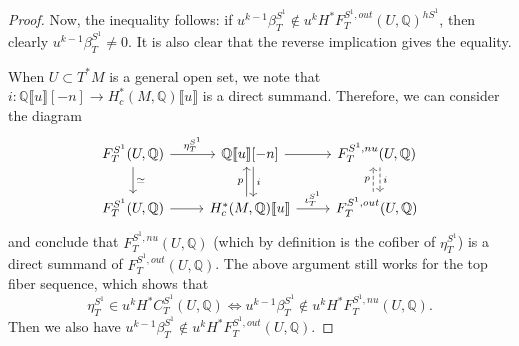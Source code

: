 \documentclass[11pt]{amsart}
\numberwithin{equation}{section}
\theoremstyle{plain}
\theoremstyle{definition}
\theoremstyle{remark}
\newcommand{\bQ} { {\mathbb{Q}}}
\newcommand{\fpw}[1]{{\llbracket #1\rrbracket}}
\begin{document}
\begin{proof}
Now, the inequality follows: if $u^{k-1}\beta_T^{S^1}\notin  u^kH^*F^{S^1,out}_{T}(U,\bQ)^{hS^1}$, then clearly $u^{k-1}\beta_T^{S^1}\neq 0$. It is also clear that the reverse implication gives the equality.

When $U \subset T^*M$ is a general open set, we note that $i: \bQ\fpw{u}[-n] \rightarrow H_c^*(M,\bQ)\fpw{u}$ is a direct summand. Therefore, we can consider the diagram
\[\begin{tikzcd}
{F_T^{S^1}(U,\bQ)}\ar[r,"{\eta_T^{S^1}}"] \ar[d,"\simeq"] & {\bQ\fpw{u}[-n]} \ar[r] \ar[d,"i", shift left=1] & F_T^{S^1,nu}(U,\bQ) \ar[d,"i", dashed, shift left=1] \\ 
{F_T^{S^1}(U,\bQ)}\ar[r] & {H_c^*(M,\bQ)\fpw{u}} \ar[r,"{\iota_T^{S^1}}"] \ar[u,"p", shift left=1] & F_T^{S^1,out}(U,\bQ) \ar[u,"p", dashed, shift left=1]
\end{tikzcd}\]
and conclude that $F_T^{S^1,nu}(U,\bQ)$ (which by definition is the cofiber of $\eta_T^{S^1}$) is a direct summand of $F_T^{S^1,out}(U,\bQ)$. The above argument still works for the top fiber sequence, which shows that
\[\eta_T^{S^1} \in u^kH^*C_T^{S^1}(U, \bQ) \iff u^{k-1}\beta_T^{S^1} \notin u^kH^*F_T^{S^1,nu}(U, \bQ).\]
Then we also have $u^{k-1}\beta_T^{S^1} \notin u^kH^*F_T^{S^1,out}(U, \bQ).$
\end{proof} 
\end{document}
